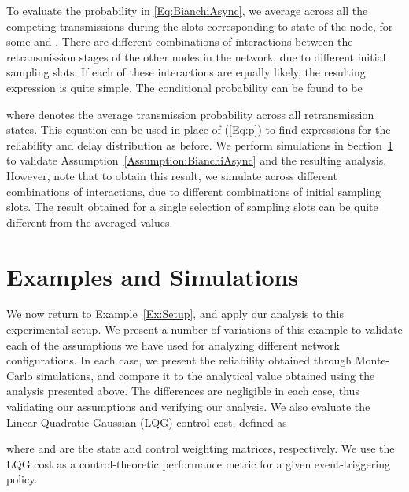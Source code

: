 \documentclass[journal]{IEEEtran}
\begin{document}
To evaluate the probability in \eqref{Eq:BianchiAsync}, we average across all the competing transmissions during the slots corresponding to state  of the  node, for some  and . There are  different combinations of interactions between the  retransmission stages of the other  nodes in the network, due to different initial sampling slots. If each of these interactions are equally likely, the resulting expression is quite simple. The conditional probability can be found to be

where  denotes the average transmission probability across all retransmission states. This equation can be used in place of (\ref{Eq:p}) to find expressions for the reliability and delay distribution as before. We perform simulations in Section~\ref{S:Sims} to validate Assumption~\ref{Assumption:BianchiAsync} and the resulting analysis. However, note that to obtain this result, we simulate across  different combinations of interactions, due to  different combinations of initial sampling slots. The result obtained for a single selection of sampling slots can be quite different from the averaged values.





\section{Examples and Simulations} \label{S:Sims}

We now return to Example~\ref{Ex:Setup}, and apply our analysis to this experimental setup. We present a number of variations of this example to validate each of the assumptions we have used for analyzing different network configurations. In each case, we present the reliability obtained through Monte-Carlo simulations, and compare it to the analytical value obtained using the analysis presented above. The differences are negligible in each case, thus validating our assumptions and verifying our analysis. We also evaluate the Linear Quadratic Gaussian (LQG) control cost, defined as

where  and  are the state and control weighting matrices, respectively. We use the LQG cost as a control-theoretic performance metric for a given event-triggering policy.
\end{document}
